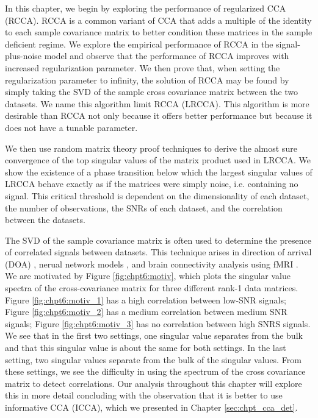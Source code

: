 In this chapter, we begin by exploring the performance of regularized CCA (RCCA). RCCA is
a common variant of CCA that adds a multiple of the identity to each sample covariance
matrix to better condition these matrices in the sample deficient regime. We explore the
empirical performance of RCCA in the signal-plus-noise model and observe that the
performance of RCCA improves with increased regularization parameter. We then prove that,
when setting the regularization parameter to infinity, the solution of RCCA may be found
by simply taking the SVD of the sample cross covariance matrix between the two
datasets. We name this algorithm limit RCCA (LRCCA). This algorithm is more desirable
than RCCA not only because it offers better performance but because it does not have a
tunable parameter.

We then use random matrix theory proof techniques to derive the almost sure convergence of
the top singular values of the matrix product used in LRCCA. We show the existence of a
phase transition below which the largest singular values of LRCCA behave exactly as if the
matrices were simply noise, i.e. containing no signal. This critical threshold is
dependent on the dimensionality of each dataset, the number of observations, the SNRs of
each dataset, and the correlation between the datasets. 

The SVD of the sample covariance matrix is often used to determine the presence of
correlated signals between datasets. This technique arises in direction of arrival (DOA)
\cite{chen2010new, gu20082, gu2007joint, kikuchi2006pair}, nerual network models
\cite{diamantaras1994cross}, and brain connectivity analysis using fMRI
\cite{worsley2005comparing}. We are motivated by Figure \ref{fig:chpt6:motiv}, which plots
the singular value spectra of the cross-covariance matrix for three different rank-1 data
matrices. Figure \ref{fig:chpt6:motiv_1} has a high correlation between low-SNR signals;
Figure \ref{fig:chpt6:motiv_2} has a medium correlation between medium SNR signals; Figure
\ref{fig:chpt6:motiv_3} has no correlation between high SNRS signals. We see that in the
first two settings, one singular value separates from the bulk and that this singular
value is about the same for both settings. In the last setting, two singular values
separate from the bulk of the singular values. From these settings, we see the difficulty
in using the spectrum of the cross covariance matrix to detect correlations. Our analysis
throughout this chapter will explore this in more detail concluding with the observation
that it is better to use informative CCA (ICCA), which we presented in Chapter
\ref{sec:chpt_cca_det}.

